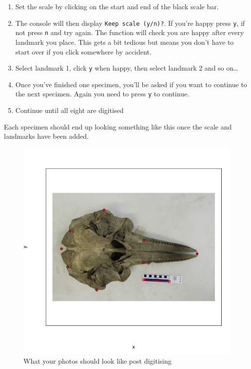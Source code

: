 \documentclass[]{book}
\providecommand{\tightlist}{%
  \setlength{\itemsep}{0pt}\setlength{\parskip}{0pt}}
\theoremstyle{definition}
\theoremstyle{definition}
\theoremstyle{definition}
\theoremstyle{remark}
\begin{document}
\begin{enumerate}
\def\labelenumi{\arabic{enumi}.}
\tightlist
\item
  Set the scale by clicking on the start and end of the black scale bar.
\item
  The console will then display \texttt{Keep\ scale\ (y/n)?}. If you're
  happy press \texttt{y}, if not press \texttt{n} and try again. The
  function will check you are happy after every landmark you place. This
  gets a bit tedious but means you don't have to start over if you click
  somewhere by accident.
\item
  Select landmark 1, click \texttt{y} when happy, then select landmark 2
  and so on\ldots{}
\item
  Once you've finished one specimen, you'll be asked if you want to
  continue to the next specimen. Again you need to press \texttt{y} to
  continue.
\item
  Continue until all eight are digitised
\end{enumerate}

Each specimen should end up looking something like this once the scale
and landmarks have been added.

\begin{figure}
\centering
\includegraphics{whale3.png}
\caption{What your photos should look like post digitising}
\end{figure}
\end{document}

